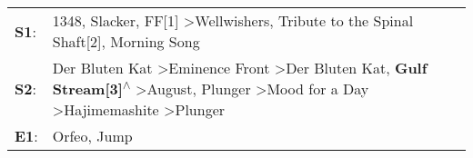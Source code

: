 \begin{supertabular}{p{0.03\textwidth}p{0.92\textwidth}}
 \textbf{S1}:  &                                                                                                                                                                                                        1348\textsuperscript{}, \enspace Slacker\textsuperscript{}, \enspace FF[1]\textsuperscript{} \textgreater \enspace Wellwishers\textsuperscript{}, \enspace Tribute to the Spinal Shaft[2]\textsuperscript{}, \enspace Morning Song\textsuperscript{}  \enspace  \\
 \textbf{S2}:  &  Der Bluten Kat\textsuperscript{} \textgreater \enspace Eminence Front\textsuperscript{} \textgreater \enspace Der Bluten Kat\textsuperscript{}, \enspace \textbf{Gulf Stream[3]\textsuperscript{$\wedge$}} \textgreater \enspace August\textsuperscript{}, \enspace Plunger\textsuperscript{} \textgreater \enspace Mood for a Day\textsuperscript{} \textgreater \enspace Hajimemashite\textsuperscript{} \textgreater \enspace Plunger\textsuperscript{}  \enspace  \\
 \textbf{E1}:  &                                                                                                                                                                                                                                                                                                                                                                                               Orfeo\textsuperscript{},  Jump\textsuperscript{}  \enspace  \\
\end{supertabular}
